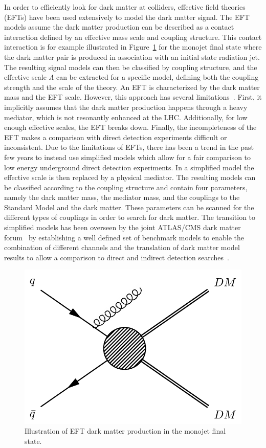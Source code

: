 In order to efficiently look for dark matter at colliders, effective field theories (EFTs) have been used extensively to model the dark matter signal. The EFT models assume the dark matter production can be described as a contact interaction defined by an effective mass scale and coupling structure. This contact interaction is for example illustrated in Figure~\ref{fig:monojet_diagram} for the monojet final state where the dark matter pair is produced in association with an initial state radiation jet. The resulting signal models can then be classified by coupling structure, and the effective scale $\Lambda$ can be extracted for a specific model, defining both the coupling strength and the scale of the theory. An EFT is characterized by the dark matter mass and the EFT scale. However, this approach has several limitations~\cite{Busoni:2013lha,Busoni:2014sya,Busoni:2014haa}. First, it implicitly assumes that the dark matter production happens through a heavy mediator, which is not resonantly enhanced at the \ac{LHC}. Additionally, for low enough effective scales, the EFT breaks down. Finally, the incompleteness of the EFT makes a comparison with direct detection experiments difficult or inconsistent. Due to the limitations of EFTs, there has been a trend in the past few years to instead use simplified models which allow for a fair comparison to low energy underground direct detection experiments. In a simplified model the effective scale is then replaced by a physical mediator. The resulting models can be classified according to the coupling structure and contain four parameters, namely the dark matter mass, the mediator mass, and the couplings to the Standard Model and the dark matter. These parameters can be scanned for the different types of couplings in order to search for dark matter. The transition to simplified models has been overseen by the joint \acs{ATLAS}/\acs{CMS} dark matter forum~\cite{Abercrombie:2015wmb} by establishing a well defined set of benchmark models to enable the combination of different channels and the translation of dark matter model results to allow a comparison to direct and indirect detection searches~\cite{Boveia:2016mrp}.

\begin{figure}[ht]
  \centering
 \includegraphics[width=.4\textwidth]{monojet.png} 
 \caption{Illustration of EFT dark matter production in the monojet final state.}
 \label{fig:monojet_diagram}
\end{figure}

